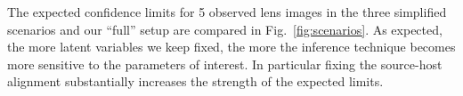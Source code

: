 \documentclass[twocolumn]{aastex62}
\begin{document}
The expected confidence limits for 5 observed lens images in the three simplified scenarios and our ``full'' setup are compared in Fig.~\ref{fig:scenarios}. As expected, the more latent variables we keep fixed, the more the inference technique becomes more sensitive to the parameters of interest. In particular fixing the source-host alignment substantially increases the strength of the expected limits.




\end{document}
